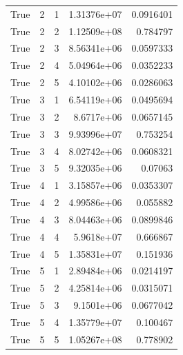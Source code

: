 \begin{tabular}{rrrrr}
True & 2 & 1 & 1.31376e+07 & 0.0916401 \\
True & 2 & 2 & 1.12509e+08 & 0.784797 \\
True & 2 & 3 & 8.56341e+06 & 0.0597333 \\
True & 2 & 4 & 5.04964e+06 & 0.0352233 \\
True & 2 & 5 & 4.10102e+06 & 0.0286063 \\
True & 3 & 1 & 6.54119e+06 & 0.0495694 \\
True & 3 & 2 & 8.6717e+06 & 0.0657145 \\
True & 3 & 3 & 9.93996e+07 & 0.753254 \\
True & 3 & 4 & 8.02742e+06 & 0.0608321 \\
True & 3 & 5 & 9.32035e+06 & 0.07063 \\
True & 4 & 1 & 3.15857e+06 & 0.0353307 \\
True & 4 & 2 & 4.99586e+06 & 0.055882 \\
True & 4 & 3 & 8.04463e+06 & 0.0899846 \\
True & 4 & 4 & 5.9618e+07 & 0.666867 \\
True & 4 & 5 & 1.35831e+07 & 0.151936 \\
True & 5 & 1 & 2.89484e+06 & 0.0214197 \\
True & 5 & 2 & 4.25814e+06 & 0.0315071 \\
True & 5 & 3 & 9.1501e+06 & 0.0677042 \\
True & 5 & 4 & 1.35779e+07 & 0.100467 \\
True & 5 & 5 & 1.05267e+08 & 0.778902 \\
\bottomrule
\end{tabular}
